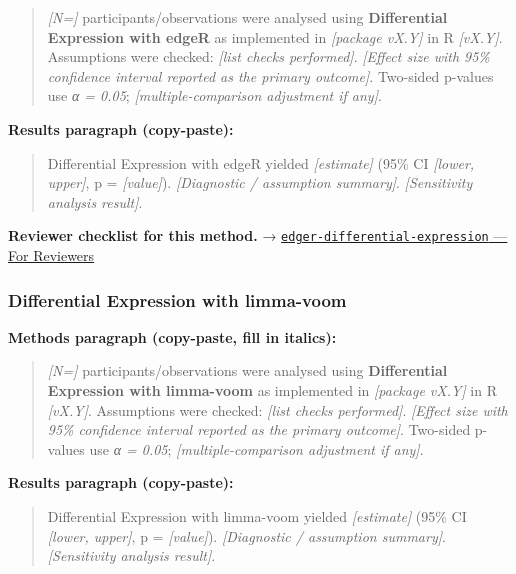 \documentclass[
]{article}
\begin{document}
\begin{quote}
\emph{{[}N={]}} participants/observations were analysed using
\textbf{Differential Expression with edgeR} as implemented in
\emph{{[}package vX.Y{]}} in R \emph{{[}vX.Y{]}}. Assumptions were
checked: \emph{{[}list checks performed{]}}. \emph{{[}Effect size with
95\% confidence interval reported as the primary outcome{]}}. Two-sided
p-values use \emph{α = 0.05}; \emph{{[}multiple-comparison adjustment if
any{]}}.
\end{quote}

\textbf{Results paragraph (copy-paste):}

\begin{quote}
Differential Expression with edgeR yielded \emph{{[}estimate{]}} (95\%
CI \emph{{[}lower, upper{]}}, p = \emph{{[}value{]}}).
\emph{{[}Diagnostic / assumption summary{]}}. \emph{{[}Sensitivity
analysis result{]}}.
\end{quote}

\textbf{Reviewer checklist for this method.} →
\href{../chapters/12-bioinformatics/edger-differential-expression.Rmd\#for-reviewers}{\texttt{edger-differential-expression}
--- For Reviewers}

\subsubsection{Differential Expression with
limma-voom}\label{differential-expression-with-limma-voom}

\textbf{Methods paragraph (copy-paste, fill in italics):}

\begin{quote}
\emph{{[}N={]}} participants/observations were analysed using
\textbf{Differential Expression with limma-voom} as implemented in
\emph{{[}package vX.Y{]}} in R \emph{{[}vX.Y{]}}. Assumptions were
checked: \emph{{[}list checks performed{]}}. \emph{{[}Effect size with
95\% confidence interval reported as the primary outcome{]}}. Two-sided
p-values use \emph{α = 0.05}; \emph{{[}multiple-comparison adjustment if
any{]}}.
\end{quote}

\textbf{Results paragraph (copy-paste):}

\begin{quote}
Differential Expression with limma-voom yielded \emph{{[}estimate{]}}
(95\% CI \emph{{[}lower, upper{]}}, p = \emph{{[}value{]}}).
\emph{{[}Diagnostic / assumption summary{]}}. \emph{{[}Sensitivity
analysis result{]}}.
\end{quote}
\end{document}
